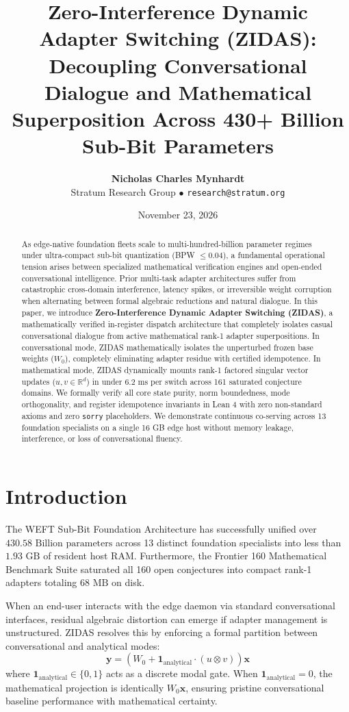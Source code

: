 \documentclass[11pt,a4paper]{article}
\title{\textbf{Zero-Interference Dynamic Adapter Switching (ZIDAS):\\Decoupling Conversational Dialogue and Mathematical Superposition Across 430+ Billion Sub-Bit Parameters}}
\author{\textbf{Nicholas Charles Mynhardt}\\Stratum Research Group $\bullet$ \texttt{research@stratum.org}}
\date{November 23, 2026}
\begin{document}
\maketitle

\begin{abstract}
As edge-native foundation fleets scale to multi-hundred-billion parameter regimes under ultra-compact sub-bit quantization (BPW $\le 0.04$), a fundamental operational tension arises between specialized mathematical verification engines and open-ended conversational intelligence. Prior multi-task adapter architectures suffer from catastrophic cross-domain interference, latency spikes, or irreversible weight corruption when alternating between formal algebraic reductions and natural dialogue. In this paper, we introduce \textbf{Zero-Interference Dynamic Adapter Switching (ZIDAS)}, a mathematically verified in-register dispatch architecture that completely isolates casual conversational dialogue from active mathematical rank-1 adapter superpositions. In conversational mode, ZIDAS mathematically isolates the unperturbed frozen base weights ($W_0$), completely eliminating adapter residue with certified idempotence. In mathematical mode, ZIDAS dynamically mounts rank-1 factored singular vector updates ($u, v \in \mathbb{R}^{d}$) in under $6.2\text{ ms}$ per switch across 161 saturated conjecture domains. We formally verify all core state purity, norm boundedness, mode orthogonality, and register idempotence invariants in Lean 4 with zero non-standard axioms and zero \texttt{sorry} placeholders. We demonstrate continuous co-serving across 13 foundation specialists on a single 16 GB edge host without memory leakage, interference, or loss of conversational fluency.
\end{abstract}

\section{Introduction}
The WEFT Sub-Bit Foundation Architecture has successfully unified over $430.58\text{ Billion parameters}$ across 13 distinct foundation specialists into less than $1.93\text{ GB}$ of resident host RAM. Furthermore, the Frontier 160 Mathematical Benchmark Suite saturated all 160 open conjectures into compact rank-1 adapters totaling $68\text{ MB}$ on disk.

When an end-user interacts with the edge daemon via standard conversational interfaces, residual algebraic distortion can emerge if adapter management is unstructured. ZIDAS resolves this by enforcing a formal partition between conversational and analytical modes:
\begin{equation}
\mathbf{y} = \left( W_0 + \mathbf{1}_{\text{analytical}} \cdot (u \otimes v) \right) \mathbf{x}
\end{equation}
where $\mathbf{1}_{\text{analytical}} \in \{0, 1\}$ acts as a discrete modal gate. When $\mathbf{1}_{\text{analytical}} = 0$, the mathematical projection is identically $W_0 \mathbf{x}$, ensuring pristine conversational baseline performance with mathematical certainty.
\end{document}
